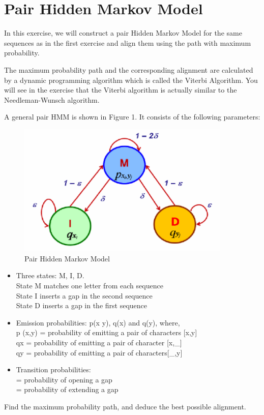 \documentclass[a4paper,11pt]{article}
\DeclareRobustCommand{\greektext}{%
  \fontencoding{LGR}\selectfont\def\encodingdefault{LGR}}
\DeclareRobustCommand{\textgreek}[1]{\leavevmode{\greektext #1}}
\begin{document}
\section{Pair Hidden Markov Model}
In this exercise, we will construct a pair Hidden Markov Model for
the same sequences as in the first exercise and align them using the
path with maximum probability.

The maximum probability path and the corresponding alignment are calculated by a dynamic
programming algorithm which is called the Viterbi Algorithm. You will
see in the exercise that the Viterbi algorithm is actually similar
to the Needleman-Wunsch algorithm.

A general pair HMM is shown in Figure 1. It consists of the following parameters:
\begin{figure}[h]
\begin{centering}
\includegraphics[width=4in]{HMMfigures.eps}\caption{Pair Hidden Markov Model}
\par\end{centering}
\end{figure}

\begin{itemize}
\item Three states: M, I, D.\\
State M matches one letter from each sequence\\
State I inserts a gap in the second sequence \\
State D inserts a gap in the first sequence

\item Emission probabilities: p(x y), q(x) and q(y), where,\\
p (x,y) = probability of emitting a pair of characters {[}x,y{]} \\
qx = probability of emitting a pair of character {[}x,\_{]}\\
qy = probability of emitting a pair of characters{[}\_,y{]}

\item Transition probabilities:\\
\textgreek{d} = probability of opening a gap \\
\textgreek{e} = probability of extending a gap \\
\end{itemize}

Find the maximum probability path, and deduce the best possible alignment.
\end{document}
